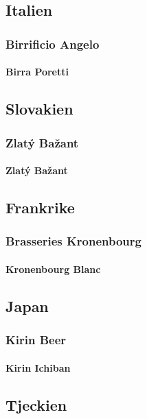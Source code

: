 \documentclass[11pt]{article}
\begin{document}
\subsection{Italien}
\label{sec:orged9c9b6}
\subsubsection{Birrificio Angelo}
\label{sec:org3838006}
\paragraph{Birra Poretti}
\label{sec:orgec38ca3}
\subsection{Slovakien}
\label{sec:org51c610d}
\subsubsection{Zlatý Bažant}
\label{sec:orgff21a93}
\paragraph{Zlatý Bažant}
\label{sec:org29b6220}
\subsection{Frankrike}
\label{sec:org84f9f26}
\subsubsection{Brasseries Kronenbourg}
\label{sec:orgf805671}
\paragraph{Kronenbourg Blanc}
\label{sec:orge95a103}
\subsection{Japan}
\label{sec:orgc7d4893}
\subsubsection{Kirin Beer}
\label{sec:orgb45dc9e}
\paragraph{Kirin Ichiban}
\label{sec:org978708b}
\subsection{Tjeckien}
\label{sec:org4c6ff57}
\end{document}
